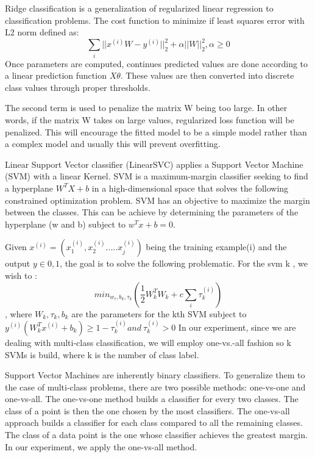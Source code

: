 Ridge classification is a generalization of regularized linear regression to classification problems.
The cost function to minimize if least squares error with L2 norm defined as:
\begin{equation}
\sum_i ||x^{(i)}W-y^{(i)}||_2^2 + \alpha ||W||_2^2, \alpha\geq 0
\label{eq:ridge-cost}
\end{equation}
Once parameters are computed, continues predicted values are done according to a linear prediction function $X\theta$. These values are then converted into discrete class values through proper thresholds.


The second term is used to penalize the matrix W being too large. In other words, if the matrix W takes on large values, regularized loss function will be penalized. This will encourage the fitted model to be a simple model rather than a complex model and usually this will prevent overfitting.

Linear Support Vector classifier (LinearSVC) applies a Support Vector Machine (SVM) with a linear Kernel. SVM is a maximum-margin classifier seeking to find a hyperplane $W^T X + b$ in a high-dimensional space that solves the following constrained optimization problem.
SVM has an objective to maximize the margin between the classes. This can be achieve by determining the parameters of the hyperplane (w and b) subject to $w^T x + b = 0$.


Given $x^{(i)}=(x_1^{(i)},x_2^{(i)}.....x_j^{(i)})$ being the training example(i) and the output $y \in {0,1}$, the goal is to solve the following problematic. For the svm k , we wish to :
$$min_{w_\tau,b_k,\tau_k}(\frac{1}{2}W_k^TW_k +c\sum_i \tau_k^{(i)})$$, where $W_k,\tau_k,b_k$ are the parameters for the kth SVM subject to $y^{(i)}(W^T_kx^{(i)}+b_k)\geq 1-\tau_k^{(i)} and \: \tau_k^{(i)}>0$
In our experiment, since we are dealing with multi-class classification, we will employ one-vs.-all fashion so k SVMs is build, where k is the number of class label.

Support Vector Machines are inherently binary classifiers. To generalize them to the case of multi-class problems, there are two possible methods: one-vs-one and one-vs-all. The one-vs-one method builds a classifier for every two classes. The class of a point is then the one chosen by the most classifiers. The one-vs-all approach builds a classifier for each class compared to all the remaining classes. The class of a data point is the one whose classifier achieves the greatest margin. In our experiment, we apply the one-vs-all method. 
 